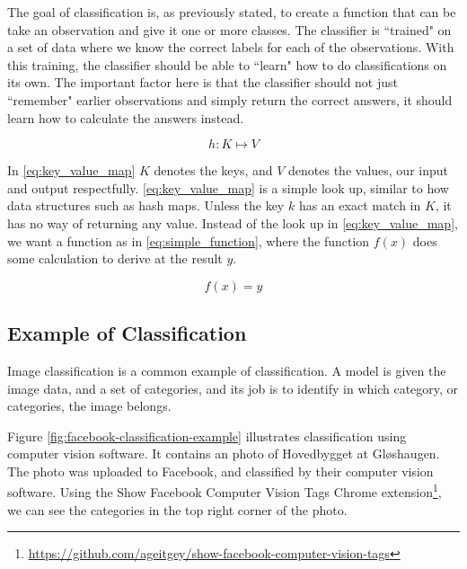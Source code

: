 The goal of classification is, as previously stated, to create a function that can be take an observation and give it one or more classes. The classifier is ``trained" on a set of data where we know the correct labels for each of the observations. With this training, the classifier should be able to ``learn" how to do classifications on its own. The important factor here is that the classifier should not just ``remember" earlier observations and simply return the correct answers, it should learn how to calculate the answers instead. 

\begin{equation}
    \label{eq:key_value_map}
    h: K \mapsto V
\end{equation}

In \ref{eq:key_value_map} $K$ denotes the keys, and $V$ denotes the values, our input and output respectfully. \ref{eq:key_value_map} is a simple look up, similar to how data structures such as hash maps. Unless the key $k$ has an exact match in $K$, it has no way of returning any value. Instead of the look up in \ref{eq:key_value_map}, we want a function as in \ref{eq:simple_function}, where the function $f(x)$ does some calculation to derive at the result $y$.

\begin{equation}
    \label{eq:simple_function}
    f(x) = y
\end{equation}

\subsection{Example of Classification}
\label{sec:classification-example}
Image classification is a common example of classification. A model is given the image data, and a set of categories, and its job is to identify in which category, or categories, the image belongs.

Figure \ref{fig:facebook-classification-example} illustrates classification using computer vision software. It contains an photo of Hovedbygget at Gløshaugen. The photo was uploaded to Facebook, and classified by their computer vision software. Using the Show Facebook Computer Vision Tags Chrome extension\footnote{\url{https://github.com/ageitgey/show-facebook-computer-vision-tags}}, we can see the categories in the top right corner of the photo.

